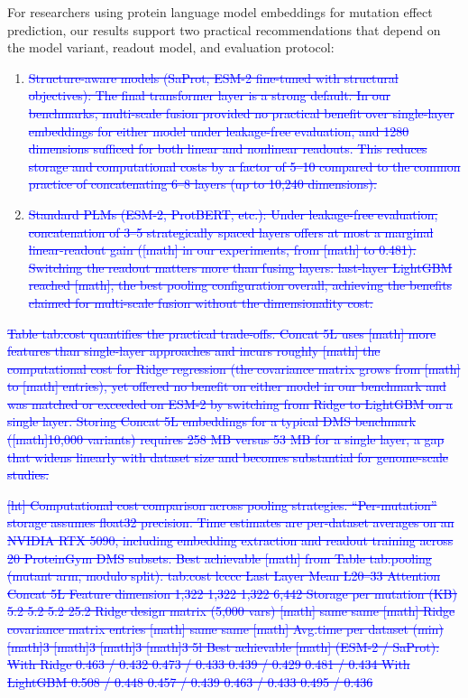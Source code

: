 \documentclass[11pt,a4paper]{article}
\begin{document}
For researchers using protein language model embeddings for mutation effect
prediction, our results support two practical recommendations that depend on
the model variant, readout model, and evaluation protocol:

\begin{enumerate}
\item 
\textcolor{blue}{\sout{Structure-aware models (SaProt, ESM-2 fine-tuned with structural
 objectives): The final transformer layer is a strong default. In our
 benchmarks, multi-scale fusion provided no practical benefit over single-layer
 embeddings for either model under leakage-free evaluation, and 1280 dimensions
 sufficed for both linear and nonlinear readouts.
 This reduces
 storage and computational costs by a factor of 5--10 compared to the common
 practice of concatenating 6--8 layers (up to 10,240 dimensions).}}

\item 
\textcolor{blue}{\sout{Standard PLMs (ESM-2, ProtBERT, etc.): Under leakage-free
 evaluation, concatenation of 3--5 strategically spaced layers offers at most a
 marginal linear-readout gain ([math] in our experiments, from [math]
 to 0.481). Switching the readout matters more than fusing layers: last-layer
 LightGBM reached [math], the best pooling configuration overall,
 achieving the benefits claimed for multi-scale fusion without the dimensionality
 cost.}}
\end{enumerate}

\textcolor{blue}{\sout{Table tab:cost quantifies the practical trade-offs. Concat 5L uses
[math] more features than single-layer approaches and incurs roughly
[math] the computational cost for Ridge regression (the covariance matrix
grows from [math] to [math] entries), yet offered no benefit on
either model in our benchmark and was matched or exceeded on
ESM-2 by switching from Ridge to LightGBM on a single layer. Storing Concat 5L embeddings for a typical DMS
benchmark ([math]10,000 variants) requires 258 MB versus 53 MB for a single
layer, a gap that widens linearly with dataset size and becomes substantial
for genome-scale studies.}}

\textcolor{blue}{\sout{[ht]
Computational cost comparison across pooling strategies.
``Per-mutation'' storage assumes float32 precision. Time estimates are
per-dataset averages on an NVIDIA RTX 5090, including embedding extraction
and readout training across 20 ProteinGym DMS subsets.
Best achievable [math] from Table tab:pooling (mutant arm,
modulo split).
tab:cost
lcccc
 Last Layer Mean L20--33 Attention Concat 5L 
Feature dimension 1,322 1,322 1,322 6,442 
Storage per mutation (KB) 5.2 5.2 5.2 25.2 
Ridge design matrix (5,000 vars) [math] same same [math] 
Ridge covariance matrix entries [math] same same [math] 
Avg.time per dataset (min) [math]3 [math]3 [math]3 [math]3 
5l Best achievable [math] (ESM-2 / SaProt): 
 With Ridge 0.463 / 0.432 0.473 / 0.433 0.439 / 0.429 0.481 / 0.434 
 With LightGBM 0.508 / 0.448 0.457 / 0.439 0.463 / 0.433 0.495 / 0.436}}
\end{document}
